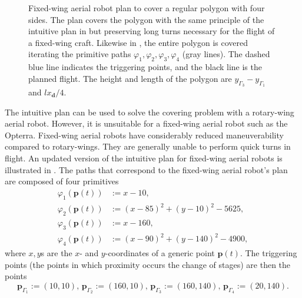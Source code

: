 \begin{figure}[p!]
  \centering
  
  \caption[Fixed-wing aerial robot's plan to cover a regular polygon with four sides]{Fixed-wing aerial robot plan to cover a regular polygon with four sides. The plan covers the polygon with the same principle of the intuitive plan in  but preserving long turns necessary for the flight of a fixed-wing craft. Likewise in , the entire polygon is covered iterating the primitive paths $\varphi_1,\varphi_2,\varphi_3,\varphi_4$ (gray lines). The dashed blue line indicates the triggering points, and the black line is the planned flight. The height and length of the polygon are $y_{\Gamma_3}-y_{\Gamma_1}$ and $lx_\mathbf{d}/4$.}
  \label{fig:plot4}
\end{figure}


The intuitive plan can be used to solve the covering problem with a rotary-wing aerial robot. However, it is unsuitable for a fixed-wing aerial robot such as the Opterra. Fixed-wing aerial robots have considerably reduced maneuverability compared to rotary-wings. They are generally unable to perform quick turns in flight. An updated version of the intuitive plan for fixed-wing aerial robots is illustrated in . The paths that correspond to the fixed-wing aerial robot's plan are composed of four primitives
\begin{subequations}\label{eq:basic-plan}\begin{align}
\varphi_1(\mathbf{p}(t))&:=x-10,\label{eq:line1}\\
\varphi_2(\mathbf{p}(t))&:=(x-85)^2+(y-10)^2-5625,\label{eq:circ1}\\
\varphi_3(\mathbf{p}(t))&:=x-160,\label{eq:line2}\\
\varphi_4(\mathbf{p}(t))&:=(x-90)^2+(y-140)^2-4900,\label{eq:circ2}\end{align}
\end{subequations}
where $x,y$s are the $x$- and $y$-coordinates of a generic point $\mathbf{p}(t)$. The triggering points (the points in which proximity occurs the change of stages) are then the points
\begin{equation}\label{eq:basic-plan-trigs}
  \mathbf{p}_{\Gamma_1}:=(10,10),\,\mathbf{p}_{\Gamma_2}:=(160,10),\,\mathbf{p}_{\Gamma_3}:=(160,140),\,\mathbf{p}_{\Gamma_4}:=(20,140).
\end{equation}

